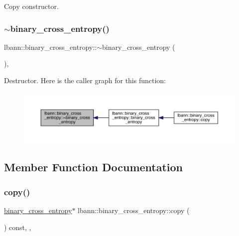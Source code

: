 Copy constructor. \mbox{\label{classlbann_1_1binary__cross__entropy_a2d3758e81b02ffdd2f57e8aae621169c}} 
\subsubsection{\texorpdfstring{$\sim$binary\+\_\+cross\+\_\+entropy()}{~binary\_cross\_entropy()}}
{\footnotesize\ttfamily lbann\+::binary\+\_\+cross\+\_\+entropy\+::$\sim$binary\+\_\+cross\+\_\+entropy (\begin{DoxyParamCaption}{ }\end{DoxyParamCaption})\hspace{0.3cm}{\ttfamily [override]}, {\ttfamily [default]}}

Destructor. Here is the caller graph for this function\+:\nopagebreak
\begin{figure}[H]
\begin{center}
\leavevmode
\includegraphics[width=350pt]{classlbann_1_1binary__cross__entropy_a2d3758e81b02ffdd2f57e8aae621169c_icgraph}
\end{center}
\end{figure}


\subsection{Member Function Documentation}
\mbox{\label{classlbann_1_1binary__cross__entropy_a5183da69553c71cb3fffc765e95c623f}} 
\subsubsection{\texorpdfstring{copy()}{copy()}}
{\footnotesize\ttfamily \hyperlink{classlbann_1_1binary__cross__entropy}{binary\+\_\+cross\+\_\+entropy}$\ast$ lbann\+::binary\+\_\+cross\+\_\+entropy\+::copy (\begin{DoxyParamCaption}{ }\end{DoxyParamCaption}) const\hspace{0.3cm}{\ttfamily [inline]}, {\ttfamily [override]}, {\ttfamily [virtual]}}

